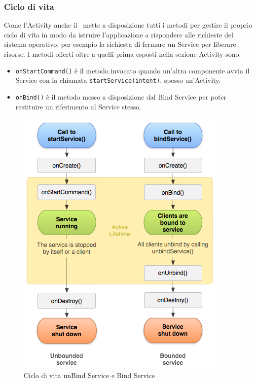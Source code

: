 \documentclass[../ManualeSviluppatore.tex]{subfiles}
\begin{document}
\begin{appendices}
			\subsubsection{Ciclo di vita}
				Come l'Activity anche il \Service\ mette a disposizione tutti i metodi per gestire il proprio ciclo di vita in modo da istruire l'applicazione a rispondere alle richieste del sistema operativo, per esempio la richiesta di fermare un Service per liberare risorse.
				I metodi offerti oltre a quelli prima esposti nella sezione Activity sono:
				\begin{itemize}
					\item \lstinline|onStartCommand()| è il metodo invocato quando un'altra componente avvia il Service con la chiamata \lstinline|startService(intent)|, spesso un'Activity.
					\item \lstinline|onBind()| è il metodo messo a disposizione dal Bind Service per poter restituire un riferimento al Service stesso.
				\end{itemize}
				
				\begin{figure} [h]
					\centering
					\includegraphics[scale=0.5]{img/ServiceCiclo}
					\caption{Ciclo di vita unBind Service e Bind Service}
					\label{fig:ServiceCiclo}
				\end{figure}
				
\end{appendices}
\end{document}
